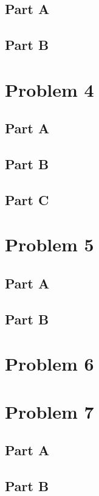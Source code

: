 \documentclass{article}
\begin{document}
\subsection*{Part A}
\subsection*{Part B}

\clearpage
\section*{Problem 4}
\subsection*{Part A}

\subsection*{Part B}

\subsection*{Part C}

\clearpage
\section*{Problem 5}
\subsection*{Part A}
\subsection*{Part B}

\clearpage
\section*{Problem 6}

\clearpage

\section*{Problem 7}
\subsection*{Part A}
\subsection*{Part B}
\end{document}
